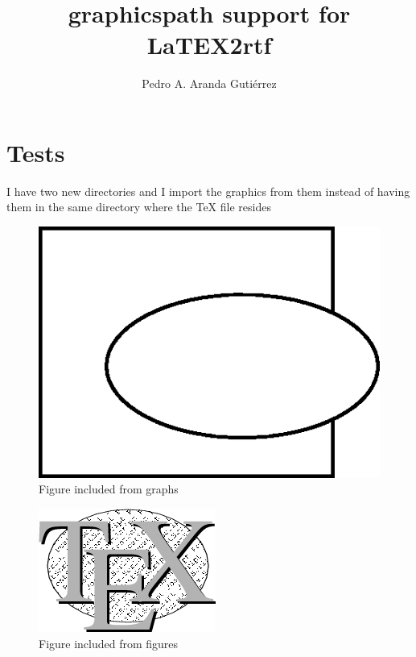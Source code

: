 \documentclass[a4paper,11pt]{article}
\title{graphicspath support for LaTEX2rtf}
\author{Pedro A. Aranda Guti\'errez}
\begin{document}
\maketitle

\section {Tests}

I have two new directories and I import the graphics
from them instead of having them in the same directory
where the TeX file resides

\begin{figure}
\includegraphics{fig_oval}
\caption{Figure included from graphs} 
\end{figure}

\begin{figure}
\includegraphics{fig_tex}
\caption{Figure included from figures} 
\end{figure}
\end{document}
